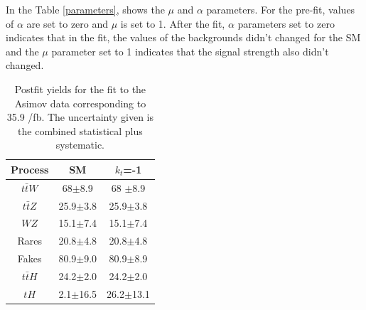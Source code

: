 \begin{linenumbers}
	In the Table \ref{parameters}, shows the $\mu$ and $\alpha$ parameters. For the pre-fit, values of $\alpha$ are set to zero and $\mu$ is set to 1. After the fit, $\alpha$ parameters set to zero indicates that in the fit, the values of the backgrounds didn't changed for the SM and the $\mu$ parameter set to 1 indicates that the signal strength also didn't changed.
	\pagebreak
	
	\begin{table}[ht!]
		\centering
		\caption{Postfit  yields for the fit to the Asimov data corresponding to 35.9 /fb. The uncertainty given is the combined statistical plus systematic.}
		\begin{tabular}{ccc}
			\hline
			Process  & SM    & $k_{t}$=-1 \\
			\hline
			$t\bar{t}W$  &  68$\pm$8.9& 68 $\pm$8.9 \\
			$t\bar{t}Z$  & 25.9$\pm$3.8&25.9$\pm$3.8\\
			$WZ$ &  15.1$\pm$7.4& 15.1$\pm$7.4\\
			Rares &  20.8$\pm$4.8& 20.8$\pm$4.8 \\
			Fakes  &  80.9$\pm$9.0&  80.9$\pm$8.9 \\
			$t\bar{t}H$  &   24.2$\pm$2.0 &  24.2$\pm$2.0 \\
			\hline
			$tH$&  2.1$\pm$16.5 &26.2$\pm$13.1 
		\end{tabular}
		\label{table1}
	\end{table}
	

\end{linenumbers}
